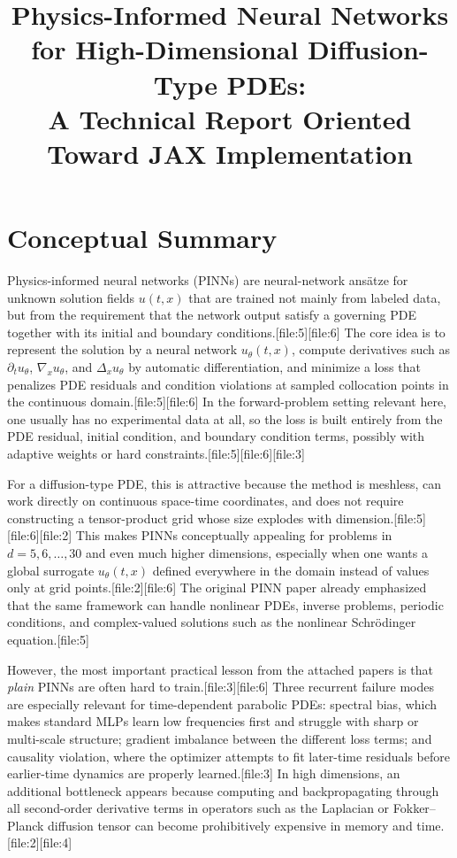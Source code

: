 \documentclass[11pt]{report}
\title{Physics-Informed Neural Networks for High-Dimensional Diffusion-Type PDEs:\\
A Technical Report Oriented Toward JAX Implementation}
\author{}
\date{}
\begin{document}
\maketitle
\tableofcontents

\chapter{Conceptual Summary}

Physics-informed neural networks (PINNs) are neural-network ans\"atze for unknown solution fields \(u(t,x)\) that are trained not mainly from labeled data, but from the requirement that the network output satisfy a governing PDE together with its initial and boundary conditions.[file:5][file:6]  
The core idea is to represent the solution by a neural network \(u_\theta(t,x)\), compute derivatives such as \(\partial_t u_\theta\), \(\nabla_x u_\theta\), and \(\Delta_x u_\theta\) by automatic differentiation, and minimize a loss that penalizes PDE residuals and condition violations at sampled collocation points in the continuous domain.[file:5][file:6]  
In the forward-problem setting relevant here, one usually has no experimental data at all, so the loss is built entirely from the PDE residual, initial condition, and boundary condition terms, possibly with adaptive weights or hard constraints.[file:5][file:6][file:3]

For a diffusion-type PDE, this is attractive because the method is meshless, can work directly on continuous space-time coordinates, and does not require constructing a tensor-product grid whose size explodes with dimension.[file:5][file:6][file:2]  
This makes PINNs conceptually appealing for problems in \(d=5,6,\dots,30\) and even much higher dimensions, especially when one wants a global surrogate \(u_\theta(t,x)\) defined everywhere in the domain instead of values only at grid points.[file:2][file:6]  
The original PINN paper already emphasized that the same framework can handle nonlinear PDEs, inverse problems, periodic conditions, and complex-valued solutions such as the nonlinear Schr\"odinger equation.[file:5]

However, the most important practical lesson from the attached papers is that \emph{plain} PINNs are often hard to train.[file:3][file:6]  
Three recurrent failure modes are especially relevant for time-dependent parabolic PDEs: spectral bias, which makes standard MLPs learn low frequencies first and struggle with sharp or multi-scale structure; gradient imbalance between the different loss terms; and causality violation, where the optimizer attempts to fit later-time residuals before earlier-time dynamics are properly learned.[file:3]  
In high dimensions, an additional bottleneck appears because computing and backpropagating through all second-order derivative terms in operators such as the Laplacian or Fokker--Planck diffusion tensor can become prohibitively expensive in memory and time.[file:2][file:4]
\end{document}
